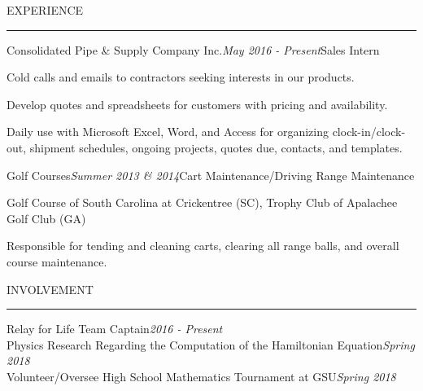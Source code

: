 \documentclass{resume}
\renewenvironment{rSection}[1]{
\sectionskip
\textcolor{RoyalPurple}{\MakeUppercase{#1}}
\sectionlineskip
\hrule
\begin{list}{}{
\setlength{\leftmargin}{1.5em}
}
\item[]
}{
\end{list}
}
\begin{document}

\begin{rSection}{Experience}

\begin{rSubsection}{Consolidated Pipe \& Supply Company Inc.}{\emph{May 2016 - Present}}{Sales Intern}{}
\item Cold calls and emails to contractors seeking interests in our products.
\item Develop quotes and spreadsheets for customers with pricing and availability.
\item Daily use with Microsoft Excel, Word, and Access for organizing clock-in/clock-out, shipment schedules, ongoing projects, quotes due, contacts, and templates.
\end{rSubsection}




\begin{rSubsection}{Golf Courses}{\emph{Summer 2013 \& 2014}}{Cart Maintenance/Driving Range Maintenance}{}
\item Golf Course of South Carolina at Crickentree (SC), Trophy Club of Apalachee Golf Club (GA)
\item Responsible for tending and cleaning carts, clearing all range balls, and overall course maintenance.
\end{rSubsection}

\end{rSection}


\begin{rSection}{Involvement} \itemsep -2pt
{Relay for Life Team Captain}\hfill {\em 2016 - Present} \\
{Physics Research Regarding the Computation of the Hamiltonian Equation}\hfill {\em Spring 2018} \\
{Volunteer/Oversee High School Mathematics Tournament at GSU}\hfill {\em Spring 2018} \\
\end{rSection}
\end{document}
